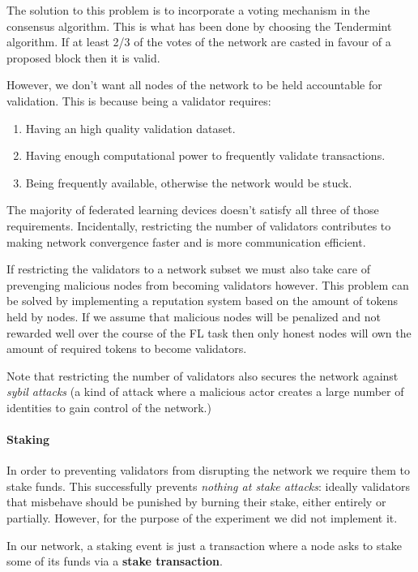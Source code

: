 The solution to this problem is to incorporate a voting mechanism in the consensus algorithm. This is what
has been done by choosing the Tendermint algorithm. If at least 2/3 of the votes of the network
are casted in favour of a proposed block then it is valid.

However, we don't want all nodes of the network to be held accountable for validation.
This is because being a validator requires:
\begin{enumerate}
  \item Having an high quality validation dataset.
  \item Having enough computational power to frequently validate transactions.
  \item Being frequently available, otherwise the network would be stuck.
\end{enumerate}
The majority of federated learning devices doesn't satisfy all three of those requirements.
Incidentally, restricting the number of validators contributes to making network convergence faster and is
more communication efficient.

If restricting the validators to a network subset we must also take care of prevenging malicious nodes from
becoming validators however.
This problem can be solved by implementing a reputation system based on the amount of tokens held by nodes.
If we assume that malicious nodes will be penalized and not rewarded well over the course of the FL task then
only honest nodes will own the amount of required tokens to become validators.

Note that restricting the number of validators also secures the network against \textit{sybil attacks} (a
  kind of attack where a malicious actor creates a large number of identities to gain
control of the network.)

\paragraph{Staking}
In order to preventing validators from disrupting the network we require them to stake funds.
This successfully prevents \textit{nothing at stake attacks}: ideally validators that misbehave should be punished by
burning their stake, either entirely or partially. However, for the purpose of the experiment we did not implement it.

In our network, a staking event is just a transaction where a node asks to stake some of its funds via a
\textbf{stake transaction}.

